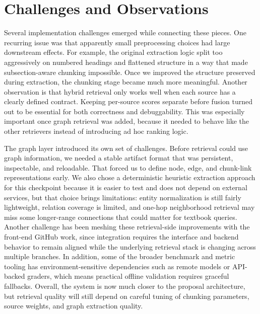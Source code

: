 \documentclass[11pt]{article}
\begin{document}
\section*{Challenges and Observations}
Several implementation challenges emerged while connecting these pieces. One recurring issue was that apparently small preprocessing choices had large downstream effects. For example, the original extraction logic split too aggressively on numbered headings and flattened structure in a way that made subsection-aware chunking impossible. Once we improved the structure preserved during extraction, the chunking stage became much more meaningful. Another observation is that hybrid retrieval only works well when each source has a clearly defined contract. Keeping per-source scores separate before fusion turned out to be essential for both correctness and debuggability. This was especially important once graph retrieval was added, because it needed to behave like the other retrievers instead of introducing ad hoc ranking logic.

The graph layer introduced its own set of challenges. Before retrieval could use graph information, we needed a stable artifact format that was persistent, inspectable, and reloadable. That forced us to define node, edge, and chunk-link representations early. We also chose a deterministic heuristic extraction approach for this checkpoint because it is easier to test and does not depend on external services, but that choice brings limitations: entity normalization is still fairly lightweight, relation coverage is limited, and one-hop neighborhood retrieval may miss some longer-range connections that could matter for textbook queries. Another challenge has been meshing these retrieval-side improvements with the front-end GitHub work, since integration requires the interface and backend behavior to remain aligned while the underlying retrieval stack is changing across multiple branches. In addition, some of the broader benchmark and metric tooling has environment-sensitive dependencies such as remote models or API-backed graders, which means practical offline validation requires graceful fallbacks. Overall, the system is now much closer to the proposal architecture, but retrieval quality will still depend on careful tuning of chunking parameters, source weights, and graph extraction quality.
\end{document}

